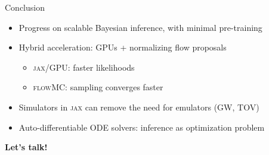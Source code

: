 \documentclass[usenames,dvipsnames,t]{beamer}
\begin{document}
\begin{frame}{Conclusion}
  \def\x{4mm}
  \def\y{1mm}

  \begin{itemize}
    \item Progress on scalable Bayesian inference, with minimal pre-training
 
    \vspace{\x}

    \item Hybrid acceleration: GPUs + normalizing flow proposals
    \begin{itemize}
      \vspace{\y}
      \item \textsc{jax}/GPU: faster likelihoods

      \vspace{\y}

      \item \textsc{flowMC}: sampling converges faster
    \end{itemize}

    \vspace{\x}

    \item Simulators in \textsc{jax} can remove the need for emulators (GW, TOV)

    \vspace{\x}

    \item Auto-differentiable ODE solvers: inference as optimization problem
  \end{itemize}
  
  \vspace{8mm}

  \textbf{Let's talk!}
\end{frame}
\end{document}
